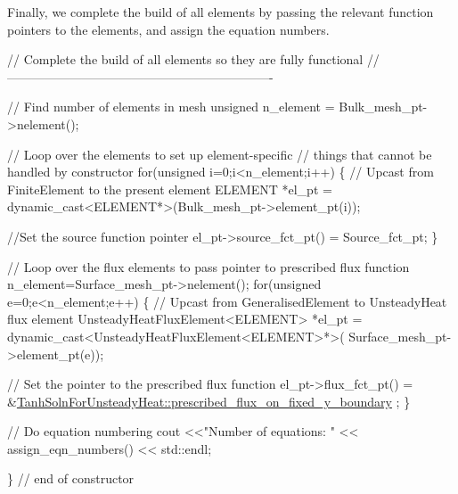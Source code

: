 Finally, we complete the build of all elements by passing the relevant function pointers to the elements, and assign the equation numbers.


\begin{DoxyCodeInclude}
 \textcolor{comment}{// Complete the build of all elements so they are fully functional}
 \textcolor{comment}{//----------------------------------------------------------------}

 \textcolor{comment}{// Find number of elements in mesh}
 \textcolor{keywordtype}{unsigned} n\_element = Bulk\_mesh\_pt->nelement();

 \textcolor{comment}{// Loop over the elements to set up element-specific }
 \textcolor{comment}{// things that cannot be handled by constructor}
 \textcolor{keywordflow}{for}(\textcolor{keywordtype}{unsigned} i=0;i<n\_element;i++)
  \{
   \textcolor{comment}{// Upcast from FiniteElement to the present element}
   ELEMENT *el\_pt = \textcolor{keyword}{dynamic\_cast<}ELEMENT*\textcolor{keyword}{>}(Bulk\_mesh\_pt->element\_pt(i));

   \textcolor{comment}{//Set the source function pointer}
   el\_pt->source\_fct\_pt() = Source\_fct\_pt;
  \}

 \textcolor{comment}{// Loop over the flux elements to pass pointer to prescribed flux function}
 n\_element=Surface\_mesh\_pt->nelement();
 \textcolor{keywordflow}{for}(\textcolor{keywordtype}{unsigned} e=0;e<n\_element;e++)
  \{
   \textcolor{comment}{// Upcast from GeneralisedElement to UnsteadyHeat flux element}
   UnsteadyHeatFluxElement<ELEMENT> *el\_pt = 
    \textcolor{keyword}{dynamic\_cast<}UnsteadyHeatFluxElement<ELEMENT>*\textcolor{keyword}{>}(
     Surface\_mesh\_pt->element\_pt(e));

   \textcolor{comment}{// Set the pointer to the prescribed flux function}
   el\_pt->flux\_fct\_pt() = 
    &\hyperlink{namespaceTanhSolnForUnsteadyHeat_af4d78d73bd9981a5a9ecacecfd0e9cb8}{TanhSolnForUnsteadyHeat::prescribed\_flux\_on\_fixed\_y\_boundary}
      ;
  \}

 \textcolor{comment}{// Do equation numbering}
 cout <<\textcolor{stringliteral}{"Number of equations: "} << assign\_eqn\_numbers() << std::endl; 

\} \textcolor{comment}{// end of constructor}

\end{DoxyCodeInclude}




 

